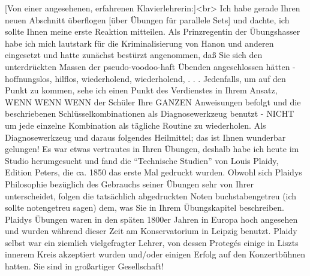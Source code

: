 \item \label{testimonials03}
[Von einer angesehenen, erfahrenen Klavierlehrerin:]<br>
Ich habe gerade Ihren neuen Abschnitt überflogen [über Übungen für parallele Sets] und dachte, ich sollte Ihnen meine erste Reaktion mitteilen.
Als Prinzregentin der Übungshasser habe ich mich lautstark für die Kriminalisierung von Hanon und anderen eingesetzt und hatte zunächst bestürzt angenommen, daß Sie sich den unterdrückten Massen der pseudo-voodoo-haft Übenden angeschlossen hätten - hoffnungslos, hilflos, wiederholend, wiederholend, . . .
Jedenfalls, um auf den Punkt zu kommen, sehe ich einen Punkt des Verdienstes in Ihrem Ansatz, WENN WENN WENN der Schüler Ihre GANZEN Anweisungen befolgt und die beschriebenen Schlüsselkombinationen als Diagnosewerkzeug benutzt - NICHT um jede einzelne Kombination als tägliche Routine zu wiederholen.
Als Diagnosewerkzeug und daraus folgendes Heilmittel; das ist Ihnen wunderbar gelungen!
Es war etwas vertrautes in Ihren Übungen, deshalb habe ich heute im Studio herumgesucht und fand die \enquote{Technische Studien} von Louis Plaidy, Edition Peters, die ca. 1850 das erste Mal gedruckt wurden.
Obwohl sich Plaidys Philosophie bezüglich des Gebrauchs seiner Übungen sehr von Ihrer unterscheidet, folgen die tatsächlich abgedruckten Noten buchstabengetreu (ich sollte notengetreu sagen) dem, was Sie in Ihrem Übungskapitel beschreiben.
Plaidys Übungen waren in den späten 1800er Jahren in Europa hoch angesehen und wurden während dieser Zeit am Konservatorium in Leipzig benutzt.
Plaidy selbst war ein ziemlich vielgefragter Lehrer, von dessen Protegés einige in Liszts innerem Kreis akzeptiert wurden und/oder einigen Erfolg auf den Konzertbühnen hatten.
Sie sind in großartiger Gesellschaft!


